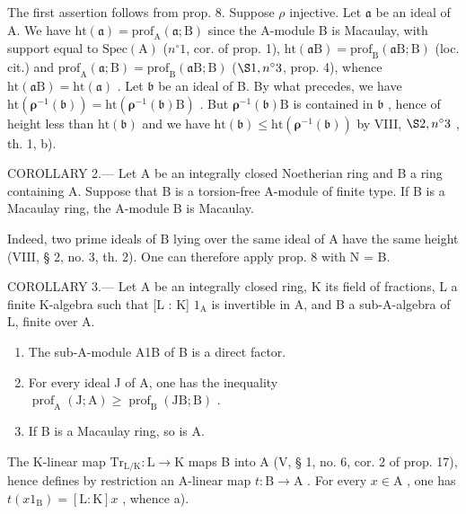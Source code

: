 The first assertion follows from prop. 8. Suppose \(\rho\) injective. Let \(\mathfrak{a}\) be an ideal of A. We have \(\mathrm{ht}(\mathfrak{a}) = \mathrm{prof}_{\mathrm{A}}(\mathfrak{a};\mathrm{B})\) since the A-module B is Macaulay, with support equal to \(\mathrm{Spec}(\mathrm{A})\) (\(n^{\circ}1\), cor. of prop. 1), \(\mathrm{ht}(\mathfrak{a}\mathrm{B}) = \mathrm{prof}_{\mathrm{B}}(\mathfrak{a}\mathrm{B};\mathrm{B})\) (loc. cit.) and \(\mathrm{prof}_{\mathrm{A}}(\mathfrak{a};\mathrm{B}) = \mathrm{prof}_{\mathrm{B}}(\mathfrak{a}\mathrm{B};\mathrm{B})\) (\(\S 1, n^{\circ}3\), prop. 4), whence \(\mathrm{ht}(\mathfrak{a}\mathrm{B}) = \mathrm{ht}(\mathfrak{a})\) . Let \(\mathfrak{b}\) be an ideal of B. By what precedes, we have \(\mathrm{ht}(\boldsymbol{\rho}^{-1}(\mathfrak{b})) = \mathrm{ht}(\boldsymbol{\rho}^{-1}(\mathfrak{b})\mathrm{B})\) . But \(\boldsymbol{\rho}^{-1}(\mathfrak{b})\mathrm{B}\) is contained in \(\mathfrak{b}\) , hence of height less than \(\mathrm{ht}(\mathfrak{b})\) and we have \(\mathrm{ht}(\mathfrak{b}) \leqslant \mathrm{ht}(\boldsymbol{\rho}^{-1}(\mathfrak{b}))\) by VIII, \(\S 2, n^{\circ}3\) , th. 1, b).

COROLLARY 2.--- Let A be an integrally closed Noetherian ring and B a ring containing A. Suppose that B is a torsion-free A-module of finite type. If B is a Macaulay ring, the A-module B is Macaulay.

Indeed, two prime ideals of B lying over the same ideal of A have the same height (VIII, § 2, no. 3, th. 2). One can therefore apply prop. 8 with N = B.

COROLLARY 3.--- Let A be an integrally closed ring, K its field of fractions, L a finite K-algebra such that {[}L : K{]} \(1_{\mathrm{A}}\) is invertible in A, and B a sub-A-algebra of L, finite over A.

\begin{enumerate}
\def\labelenumi{\alph{enumi})}
\item
  The sub-A-module A1B of B is a direct factor.
\item
  For every ideal J of A, one has the inequality \(\operatorname{prof}_{\mathrm{A}}(\mathrm{J};\mathrm{A})\geqslant\operatorname{prof}_{\mathrm{B}}(\mathrm{JB};\mathrm{B})\) .
\item
  If B is a Macaulay ring, so is A.
\end{enumerate}

The K-linear map \(\mathrm{Tr}_{\mathrm{L/K}}: \mathrm{L} \to \mathrm{K}\) maps B into A (V, § 1, no. 6, cor. 2 of prop. 17), hence defines by restriction an A-linear map \(t: \mathrm{B} \to \mathrm{A}\) . For every \(x \in \mathrm{A}\) , one has \(t(x1_{\mathrm{B}}) = [\mathrm{L}: \mathrm{K}]x\) , whence a).

